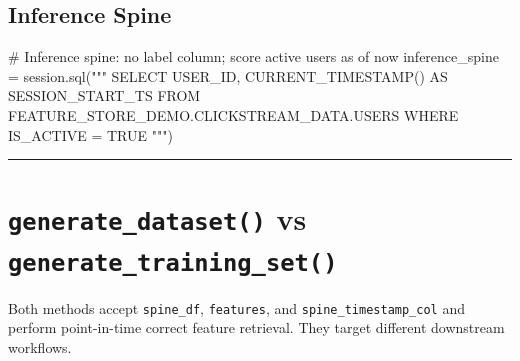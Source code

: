 \documentclass[
  letterpaper,
  DIV=11,
  numbers=noendperiod]{scrreprt}
\newenvironment{Shaded}{\begin{snugshade}}{\end{snugshade}}
\newcommand{\CommentTok}[1]{\textcolor[rgb]{0.37,0.37,0.37}{#1}}
\newcommand{\NormalTok}[1]{\textcolor[rgb]{0.00,0.23,0.31}{#1}}
\newcommand{\OperatorTok}[1]{\textcolor[rgb]{0.37,0.37,0.37}{#1}}
\newcommand{\StringTok}[1]{\textcolor[rgb]{0.13,0.47,0.30}{#1}}
\begin{document}
\hypertarget{inference-spine}{%
\subsection{Inference Spine}\label{inference-spine}}

\begin{Shaded}
\begin{Highlighting}[]
\CommentTok{\# Inference spine: no label column; score active users as of now}
\NormalTok{inference\_spine }\OperatorTok{=}\NormalTok{ session.sql(}\StringTok{"""}
\StringTok{    SELECT}
\StringTok{        USER\_ID,}
\StringTok{        CURRENT\_TIMESTAMP() AS SESSION\_START\_TS}
\StringTok{    FROM FEATURE\_STORE\_DEMO.CLICKSTREAM\_DATA.USERS}
\StringTok{    WHERE IS\_ACTIVE = TRUE}
\StringTok{"""}\NormalTok{)}
\end{Highlighting}
\end{Shaded}

\begin{center}\rule{0.5\linewidth}{0.5pt}\end{center}

\hypertarget{generate_dataset-vs-generate_training_set}{%
\section{\texorpdfstring{\texttt{generate\_dataset()} vs
\texttt{generate\_training\_set()}}{generate\_dataset() vs generate\_training\_set()}}\label{generate_dataset-vs-generate_training_set}}

Both methods accept \texttt{spine\_df}, \texttt{features}, and
\texttt{spine\_timestamp\_col} and perform point-in-time correct feature
retrieval. They target different downstream workflows.
\end{document}
